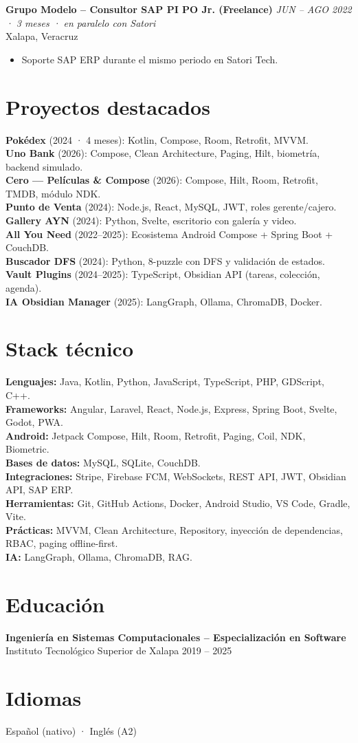 \documentclass[letterpaper,10pt]{article}
\begin{document}
\textbf{Grupo Modelo -- Consultor SAP PI PO Jr. (Freelance)} \hfill \textit{JUN -- AGO 2022 · 3 meses · en paralelo con Satori}\\
Xalapa, Veracruz
\begin{itemize}
    \item Soporte SAP ERP durante el mismo periodo en Satori Tech.
\end{itemize}

\section*{Proyectos destacados}
\textbf{Pokédex} (2024 · 4 meses): Kotlin, Compose, Room, Retrofit, MVVM.\\
\textbf{Uno Bank} (2026): Compose, Clean Architecture, Paging, Hilt, biometría, backend simulado.\\
\textbf{Cero — Películas \& Compose} (2026): Compose, Hilt, Room, Retrofit, TMDB, módulo NDK.\\
\textbf{Punto de Venta} (2024): Node.js, React, MySQL, JWT, roles gerente/cajero.\\
\textbf{Gallery AYN} (2024): Python, Svelte, escritorio con galería y video.\\
\textbf{All You Need} (2022--2025): Ecosistema Android Compose + Spring Boot + CouchDB.\\
\textbf{Buscador DFS} (2024): Python, 8-puzzle con DFS y validación de estados.\\
\textbf{Vault Plugins} (2024--2025): TypeScript, Obsidian API (tareas, colección, agenda).\\
\textbf{IA Obsidian Manager} (2025): LangGraph, Ollama, ChromaDB, Docker.

\section*{Stack técnico}
\textbf{Lenguajes:} Java, Kotlin, Python, JavaScript, TypeScript, PHP, GDScript, C++.\\
\textbf{Frameworks:} Angular, Laravel, React, Node.js, Express, Spring Boot, Svelte, Godot, PWA.\\
\textbf{Android:} Jetpack Compose, Hilt, Room, Retrofit, Paging, Coil, NDK, Biometric.\\
\textbf{Bases de datos:} MySQL, SQLite, CouchDB.\\
\textbf{Integraciones:} Stripe, Firebase FCM, WebSockets, REST API, JWT, Obsidian API, SAP ERP.\\
\textbf{Herramientas:} Git, GitHub Actions, Docker, Android Studio, VS Code, Gradle, Vite.\\
\textbf{Prácticas:} MVVM, Clean Architecture, Repository, inyección de dependencias, RBAC, paging offline-first.\\
\textbf{IA:} LangGraph, Ollama, ChromaDB, RAG.

\section*{Educación}
\textbf{Ingeniería en Sistemas Computacionales -- Especialización en Software}\\
Instituto Tecnológico Superior de Xalapa \hfill 2019 -- 2025

\section*{Idiomas}
Español (nativo) · Inglés (A2)
\end{document}
